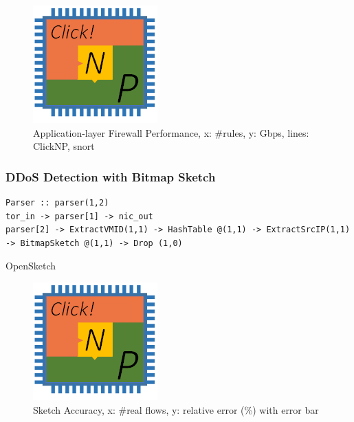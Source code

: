 {\begin{figure}[h!]
	\centering
	\includegraphics[width=0.6\columnwidth]{image/logo}
	\vspace{-0.15in}
	\caption{Application-layer Firewall Performance, x: \#rules, y: Gbps, lines: ClickNP, snort \cite{roesch1999snort}}
	\vspace{-0.15in}
	\label{clicknp:fig:WAF_Performance}
\end{figure}

\subsubsection{DDoS Detection with Bitmap Sketch}

\begin{lstlisting}
Parser :: parser(1,2)
tor_in -> parser[1] -> nic_out
parser[2] -> ExtractVMID(1,1) -> HashTable @(1,1) -> ExtractSrcIP(1,1) -> BitmapSketch @(1,1) -> Drop (1,0)
\end{lstlisting}

OpenSketch \cite{yu2013software}

\begin{figure}[h!]
	\centering
	\includegraphics[width=0.6\columnwidth]{image/logo}
	\vspace{-0.15in}
	\caption{Sketch Accuracy, x: \#real flows, y: relative error (\%) with error bar}
	\vspace{-0.15in}
	\label{clicknp:fig:SketchAccuracy}
\end{figure}


}
